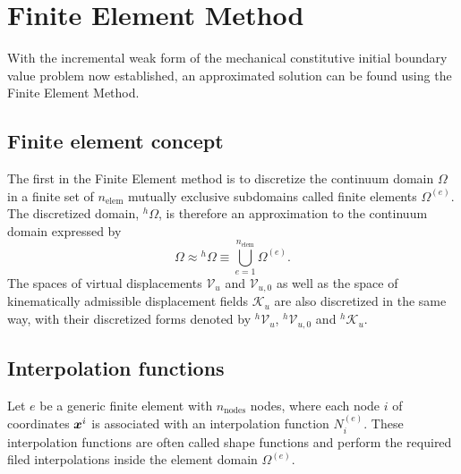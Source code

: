\section{Finite Element Method} \label{sec:fem}

With the incremental weak form of the mechanical constitutive initial boundary value problem now established, an approximated solution can be found using the Finite Element Method.

\subsection{Finite element concept}

The first in the Finite Element method is to discretize the continuum domain $\Omega$ in a finite set of $n_\text{elem}$ mutually exclusive subdomains called finite elements $\Omega^{(e)}$.
The discretized domain, $^h\Omega$, is therefore an approximation to the continuum domain expressed by
\begin{equation}
    \Omega \approx {}^h\Omega \equiv \bigcup_{e=1}^{n_\text{elem}}\Omega^{(e)}.
\end{equation}
The spaces of virtual displacements $\mathscr{V}_u$ and \(\mathscr V_{u,0}\) as well as the space of kinematically admissible displacement fields $\mathscr{K}_u$ are also discretized in the same way, with their discretized forms denoted by $^h\mathscr{V}_u$, \(^h\mathscr{V}_{u,0}\) and $^h\mathscr{K}_u$.

\subsection{Interpolation functions}

Let $e$ be a generic finite element with $n_\text{nodes}$ nodes, where each node $i$ of coordinates $\bm{x}^i$ is associated with an interpolation function $N_i^{(e)}$.
These interpolation functions are often called shape functions and perform the required filed interpolations inside the element domain $\Omega^{(e)}$.

